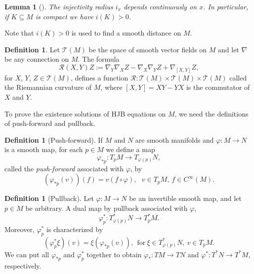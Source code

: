 \documentclass[a4paper]{article}
\numberwithin{equation}{section}
\newtheorem{lemma}[theorem]{Lemma}
\theoremstyle{definition}
\newtheorem{definition}[theorem]{Definition}
\begin{document}
\begin{lemma}[\cite{K1982}] \label{lemma:compact_positive_injectivity_radius}
	The injectivity radius $i_x$ depends continuously on $ x$. In particular, if $K \subseteq M$ is compact we have $i(K) > 0$. 
\end{lemma}

Note that $i(K)>0$ is used to find a smooth distance on $M$.
\begin{definition}
	Let $\mathcal{T}(M)$ be the space of smooth vector ﬁelds on $M$ and let $\nabla$ be any connection on $M$. The formula
	\begin{equation*}
		\mathcal{R}(X,Y)Z:=\nabla_Y\nabla_XZ-\nabla_X\nabla_YZ+\nabla_{[X,Y]}Z,
	\end{equation*}
	for $X$, $Y$, $Z\in \mathcal{T}(M)$, defines a function
	$\mathcal{R}:\mathcal{T}(M)\times \mathcal{T}(M)\times \mathcal{T}(M)$ called the Riemannian curvature of $M$, where $[X,Y]=XY-YX$ is the commutator of $X$ and $Y$.
\end{definition}
\par
To prove the existence solutions of HJB equations on $M$, we need the definitions of push-forward and pullback.
\begin{definition}[Push-forward]
	If $M$ and $N$ are smooth manifolds and $\varphi:M\to N$ is a smooth map, for each $p\in M$ we define a map 
	\begin{equation}\label{eqn_push_forward}
		\varphi_{*p}:T_pM\to T_{\varphi(p)}N,
	\end{equation} called the \textit{push-forward} associated with $\varphi$, by
	\begin{equation*}
		(\varphi_{*p}(v))(f)=v(f\circ \varphi),~~~v\in T_pM,~f\in C^\infty(M).
	\end{equation*}
	
\end{definition}
\begin{definition}[Pullback]
	Let 
	$\varphi: M\to N$ be an invertible smooth map, and let $p\in M$ be arbitrary. 
	A dual map by pullback associated with $\varphi$,
	\begin{equation*}
		\varphi^*_p:T^*_{\varphi(p)} N \to T^*_pM.
	\end{equation*}
	Moreover, $\varphi^{*}_p$ is characterized by
	\begin{equation}\label{eqn_xiX}
		(\varphi^{*}_p\xi)(v)=\xi(\varphi_{*p}(v)), ~~\mbox{for}~\xi \in T^*_{\varphi(p)} N,~v\in T_pM.
	\end{equation}
	We can put all $\varphi_{*p} $ and $\varphi^*_p$ together to obtain $\varphi_*:TM\to TN$ and $\varphi^*:T^*N \to T^*M$, respectively.
	
\end{definition}
\end{document}
